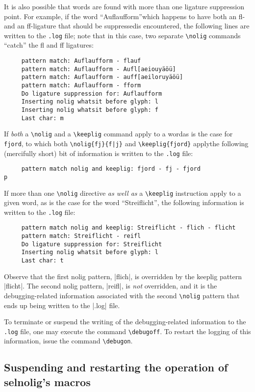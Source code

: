 \documentclass[11pt]{article}
\newcommand{\pkg}[1]{\textsf{#1}}
\newcommand{\opt}[1]{\texttt{#1}}
\newcommand{\cmmd}[1]{\texttt{\textbackslash #1}}
\begin{document}
It is also possible that words are found with more than one ligature suppression point. For example, if the word \enquote{Auflaufform}\textemdash which happens to have both an fl- and an ff-ligature that should be suppressed\textemdash is encountered, the following lines are written to the \opt{.log} file; note that in this case, two separate \cmmd{nolig} commands \enquote{catch} the fl and ff ligatures:
\begin{Verbatim}
     pattern match: Auflaufform - flauf
     pattern match: Auflaufform - Aufl[aeiouyäöü]
     pattern match: Auflaufform - auff[aeiloruyäöü]
     pattern match: Auflaufform - fform
     Do ligature suppression for: Auflaufform
     Inserting nolig whatsit before glyph: l
     Inserting nolig whatsit before glyph: f
     Last char: m
\end{Verbatim}

If \emph{both} a \cmmd{nolig} and a \cmmd{keeplig} command apply to a word\textemdash as is the case for \opt{fjord}, to which both \Verb+\nolig{fj}{f|j}+ and \Verb+\keeplig{fjord}+ apply\textemdash the following (mercifully short) bit of information is written to the \opt{.log} file:
\begin{Verbatim}
     pattern match nolig and keeplig: fjord - fj - fjord
p\end{Verbatim}

If more than one \cmmd{nolig} directive \emph{as well as} a \cmmd{keeplig} instruction apply to a given word, as is the case for the word \enquote{Streiflicht}, the following information is written to the \opt{.log} file:
\begin{Verbatim}
     pattern match nolig and keeplig: Streiflicht - flich - flicht
     pattern match: Streiflicht - reifl
     Do ligature suppression for: Streiflicht
     Inserting nolig whatsit before glyph: l
     Last char: t
     \end{Verbatim}
Observe that the first nolig pattern, |flich|, is overridden by the keeplig pattern |flicht|. The second nolig pattern, |reifl|, is \emph{not} overridden, and it is the debugging-related information associated with the second \cmmd{nolig} pattern that ends up being written to the |.log| file. 

To terminate or suspend the writing of the debugging-related information to the \opt{.log} file, one may execute the command \cmmd{debugoff}. To restart the logging of this information, issue the command \cmmd{debugon}.



\subsection[Suspending and restarting the operation of selnolig's macros]{Suspending and restarting the operation of \pkg{selnolig}'s macros}
\end{document}

